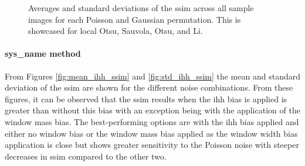 \begin{figure}[h!]
    \centering
    \caption[Averages and standard deviations of the SSIM across all sample images for each Poisson and Gaussian permutation]{Averages and standard deviations of the \gls{ssim} across all sample images for each Poisson and Gaussian permutation. This is showcased for local Otsu, Sauvola, Otsu, and Li.}
    \label{fig:ssim_thresh_surface}
\end{figure}

\paragraph{\gls{sys_name} method}
From Figures \ref{fig:mean_ihh_ssim} and \ref{fig:std_ihh_ssim} the mean and standard deviation of the \gls{ssim} are shown for the different noise combinations. From these figures, it can be observed that the \gls{ssim} results when the \gls{ihh} bias is applied is greater than without this bias with an exception being with the application of the window mass bias. The best-performing options are with the \gls{ihh} bias applied and either no window bias or the window mass bias applied as the window width bias application is close but shows greater sensitivity to the Poisson noise with steeper decreases in \gls{ssim} compared to the other two.

